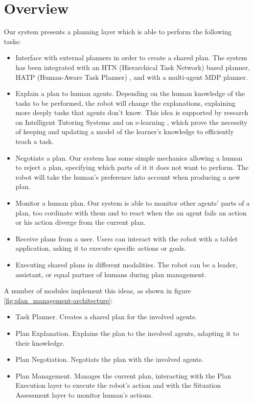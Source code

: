 \section{Overview}
\label{sec-plan_management-overview}
Our system presents a planning layer which is able to perform the following tasks:
\begin{itemize}
	\item Interface with external planners in order to create a shared plan. The system has been integrated with an HTN (Hierarchical Task Network) based planner, HATP (Human-Aware Task Planner) , and with a multi-agent MDP planner.
	\item Explain a plan to human agents. Depending on the human knowledge of the tasks to be performed, the robot will change the explanations, explaining more deeply tasks that agents don't know. This idea is supported by research on Intelligent Tutoring Systems \cite{brusilovskiy1994construction}  and on e-learning \cite{brusilovskiy2005}, which  prove the necessity of keeping and updating a model of the learner's knowledge to efficiently teach a task.
	\item Negotiate a plan. Our system has some simple mechanics allowing a human to reject a plan, specifying which parts of it it does not want to perform. The robot will take the human's preference into account when producing a new plan.
	\item Monitor a human plan. Our system is able to monitor other agents' parts of a plan, too cordinate with them and to react when the an agent fails an action or his action diverge from the current plan.
	\item Receive plans from a user. Users can interact with the robot with a tablet application, asking it to execute specific actions or goals.
	\item Executing shared plans in different modalities. The robot can be a leader, assistant, or equal partner of humans during plan management.
\end{itemize}

A number of modules implement this ideas, as shown in figure \ref{fig:plan_management-architecture}:
\begin{itemize}
\item Task Planner. Creates a shared plan for the involved agents.
\item Plan Explanation. Explains the plan to the involved agents, adapting it to their knowledge.
\item Plan Negotiation. Negotiats the plan with the involved agents.
\item Plan Management. Manages the current plan, interacting with the Plan Execution layer to execute the robot's action and with the Situation Assessment layer to monitor human's actions.
\end{itemize}

